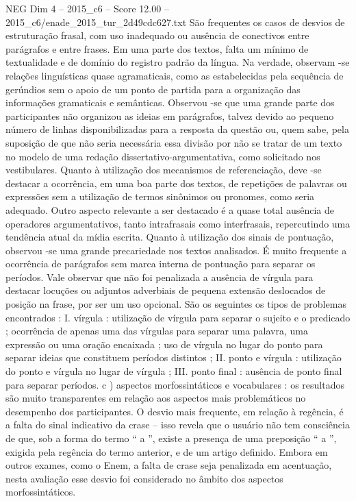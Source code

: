 \begin{textsample}{NEG Dim 4 – 2015\_c6 – Score 12.00 – 2015\_c6/enade\_2015\_tur\_2d49cdc627.txt}
São frequentes os casos de desvios de estruturação frasal, com uso inadequado ou ausência de conectivos entre parágrafos e entre frases.
Em uma parte dos textos, falta um mínimo de textualidade e de domínio do registro padrão da língua.
Na verdade, observam -se relações linguísticas quase agramaticais, como as estabelecidas pela sequência de gerúndios sem o apoio de um ponto de partida para a organização das informações gramaticais e semânticas.
Observou -se que uma grande parte dos participantes não organizou as ideias em parágrafos, talvez devido ao pequeno número de linhas disponibilizadas para a resposta da questão ou, quem sabe, pela suposição de que não seria necessária essa divisão por não se tratar de um texto no modelo de uma redação dissertativo-argumentativa, como solicitado nos vestibulares.
Quanto à utilização dos mecanismos de referenciação, deve -se destacar a ocorrência, em uma boa parte dos textos, de repetições de palavras ou expressões sem a utilização de termos sinônimos ou pronomes, como seria adequado.
Outro aspecto relevante a ser destacado é a quase total ausência de operadores argumentativos, tanto intrafrasais como interfrasais, repercutindo uma tendência atual da mídia escrita.
Quanto à utilização dos sinais de pontuação, observou -se uma grande precariedade nos textos analisados.
É muito frequente a ocorrência de parágrafos sem marca interna de pontuação para separar os períodos.
Vale observar que não foi penalizada a ausência de vírgula para destacar locuções ou adjuntos adverbiais de pequena extensão deslocados de posição na frase, por ser um uso opcional.
São os seguintes os tipos de problemas encontrados : I. vírgula : utilização de vírgula para separar o sujeito e o predicado ; ocorrência de apenas uma das vírgulas para separar uma palavra, uma expressão ou uma oração encaixada ; uso de vírgula no lugar do ponto para separar ideias que constituem períodos distintos ; II. ponto e vírgula : utilização do ponto e vírgula no lugar de vírgula ; III. ponto final : ausência de ponto final para separar períodos. c ) aspectos morfossintáticos e vocabulares : os resultados são muito transparentes em relação aos aspectos mais problemáticos no desempenho dos participantes.
O desvio mais frequente, em relação à regência, é a falta do sinal indicativo da crase – isso revela que o usuário não tem consciência de que, sob a forma do termo “ a ”, existe a presença de uma preposição “ a ”, exigida pela regência do termo anterior, e de um artigo definido.
Embora em outros exames, como o Enem, a falta de crase seja penalizada em acentuação, nesta avaliação esse desvio foi considerado no âmbito dos aspectos morfossintáticos.

\end{textsample}
